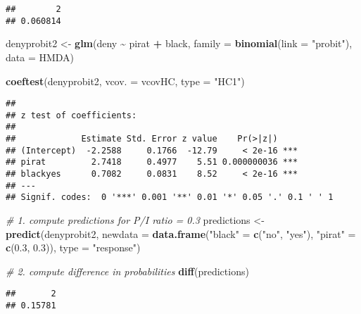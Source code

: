 \documentclass[
]{article}
\newenvironment{Shaded}{\begin{snugshade}}{\end{snugshade}}
\newcommand{\CommentTok}[1]{\textcolor[rgb]{0.56,0.35,0.01}{\textit{#1}}}
\newcommand{\DataTypeTok}[1]{\textcolor[rgb]{0.13,0.29,0.53}{#1}}
\newcommand{\FloatTok}[1]{\textcolor[rgb]{0.00,0.00,0.81}{#1}}
\newcommand{\KeywordTok}[1]{\textcolor[rgb]{0.13,0.29,0.53}{\textbf{#1}}}
\newcommand{\NormalTok}[1]{#1}
\newcommand{\OperatorTok}[1]{\textcolor[rgb]{0.81,0.36,0.00}{\textbf{#1}}}
\newcommand{\StringTok}[1]{\textcolor[rgb]{0.31,0.60,0.02}{#1}}
\begin{document}
\begin{verbatim}
##        2 
## 0.060814
\end{verbatim}

\begin{Shaded}
\begin{Highlighting}[]
\NormalTok{denyprobit2 \textless{}{-}}\StringTok{ }\KeywordTok{glm}\NormalTok{(deny }\OperatorTok{\textasciitilde{}}\StringTok{ }\NormalTok{pirat }\OperatorTok{+}\StringTok{ }\NormalTok{black, }
                   \DataTypeTok{family =} \KeywordTok{binomial}\NormalTok{(}\DataTypeTok{link =} \StringTok{"probit"}\NormalTok{), }
                   \DataTypeTok{data =}\NormalTok{ HMDA)}

\KeywordTok{coeftest}\NormalTok{(denyprobit2, }\DataTypeTok{vcov. =}\NormalTok{ vcovHC, }\DataTypeTok{type =} \StringTok{"HC1"}\NormalTok{)}
\end{Highlighting}
\end{Shaded}

\begin{verbatim}
## 
## z test of coefficients:
## 
##             Estimate Std. Error z value    Pr(>|z|)    
## (Intercept)  -2.2588     0.1766  -12.79     < 2e-16 ***
## pirat         2.7418     0.4977    5.51 0.000000036 ***
## blackyes      0.7082     0.0831    8.52     < 2e-16 ***
## ---
## Signif. codes:  0 '***' 0.001 '**' 0.01 '*' 0.05 '.' 0.1 ' ' 1
\end{verbatim}

\begin{Shaded}
\begin{Highlighting}[]
\CommentTok{\# 1. compute predictions for P/I ratio = 0.3}
\NormalTok{predictions \textless{}{-}}\StringTok{ }\KeywordTok{predict}\NormalTok{(denyprobit2, }
                       \DataTypeTok{newdata =} \KeywordTok{data.frame}\NormalTok{(}\StringTok{"black"}\NormalTok{ =}\StringTok{ }\KeywordTok{c}\NormalTok{(}\StringTok{"no"}\NormalTok{, }\StringTok{"yes"}\NormalTok{), }
                                            \StringTok{"pirat"}\NormalTok{ =}\StringTok{ }\KeywordTok{c}\NormalTok{(}\FloatTok{0.3}\NormalTok{, }\FloatTok{0.3}\NormalTok{)),}
                       \DataTypeTok{type =} \StringTok{"response"}\NormalTok{)}

\CommentTok{\# 2. compute difference in probabilities}
\KeywordTok{diff}\NormalTok{(predictions)}
\end{Highlighting}
\end{Shaded}

\begin{verbatim}
##       2 
## 0.15781
\end{verbatim}
\end{document}
